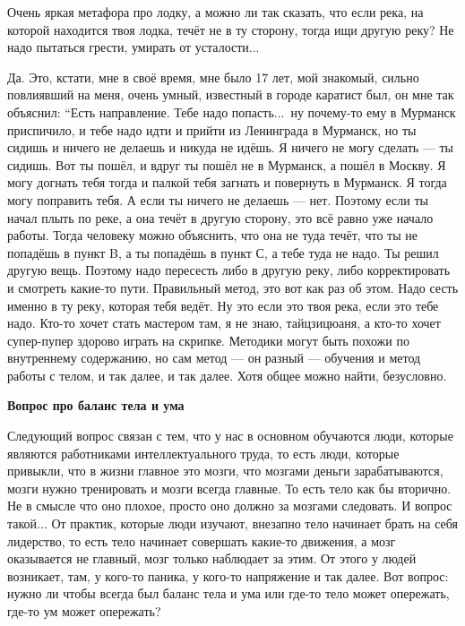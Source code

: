 \A
Очень яркая метафора про лодку, а можно ли так сказать, что если река, на которой находится
твоя лодка, течёт не в ту
сторону, тогда ищи другую реку? Не надо пытаться грести, умирать от усталости...

\T
Да. Это, кстати, мне в своё время, мне было 17 лет, мой знакомый, сильно повлиявший на меня, очень
умный, известный в
городе каратист был, он мне так объяснил: ``Есть направление. Тебе надо попасть...\ ну почему-то
ему в Мурманск
приспичило, и тебе надо идти и прийти из Ленинграда в Мурманск, но ты сидишь и
ничего не делаешь и никуда
не идёшь. Я ничего не могу сделать --- ты сидишь. Вот ты пошёл, и вдруг ты пошёл не в Мурманск, а
пошёл в Москву.
Я могу догнать тебя тогда и палкой тебя загнать и повернуть в Мурманск. Я тогда могу
поправить тебя. А если ты
ничего не делаешь --- нет. Поэтому если ты начал плыть по реке, а она течёт в другую сторону,
это всё
равно уже начало
работы. Тогда человеку можно объяснить, что она не туда течёт,
что ты не попадёшь в пункт B, а ты попадёшь в пункт С, а тебе туда не надо. Ты решил другую вещь.
Поэтому надо
пересесть либо в другую реку, либо корректировать и смотреть какие-то пути.\hfil\break
\indent
Правильный метод, это вот как раз об
этом. Надо сесть именно в ту реку, которая тебя ведёт. Ну
это если это твоя река,
если это тебе надо.
Кто-то хочет стать мастером там, я не знаю, тайцзицюаня, а кто-то хочет супер-пупер здорово
играть на скрипке.
Методики могут быть похожи по внутреннему содержанию, но сам метод --- он разный --- обучения и
метод работы с телом, и так
далее, и так далее.
Хотя общее можно найти, безусловно.

\null
\centerline{\bf Вопрос про баланс тела и ума}
\null

\A
Следующий вопрос связан с тем, что у нас в основном обучаются люди,
которые являются работниками
интеллектуального труда, то есть люди, которые привыкли, что в жизни главное это мозги, что
мозгами деньги
зарабатываются, мозги нужно тренировать и мозги всегда главные.
То есть тело как бы
вторично. Не в смысле что оно
плохое, просто оно должно за мозгами следовать.\hfil\break
\indent
И вопрос такой... От практик, которые люди изучают, внезапно тело начинает брать на себя
лидерство, то есть тело
начинает совершать какие-то движения, а мозг оказывается не главный, мозг только наблюдает
за этим. От этого у
людей возникает, там, у кого-то паника, у кого-то напряжение и так далее.
Вот вопрос: нужно ли чтобы всегда был баланс тела и ума или где-то тело может опережать,
где-то ум может опережать?

